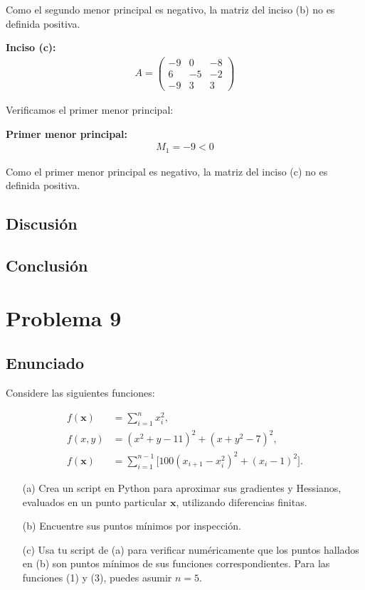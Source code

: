 \documentclass{article}
\begin{document}
Como el segundo menor principal es negativo, la matriz del inciso (b) no es definida positiva.

\textbf{Inciso (c):}
\begin{align}
     A=\begin{pmatrix} -9 & 0 & -8\\ 6 & -5 & -2\\ -9 & 3 & 3 \end{pmatrix}
\end{align}

Verificamos el primer menor principal:

\textbf{Primer menor principal:}
\begin{align}
M_1 = -9 < 0
\end{align}

Como el primer menor principal es negativo, la matriz del inciso (c) no es definida positiva.

\subsection{Discusión}

\subsection{Conclusión}

\section{Problema 9}

\subsection{Enunciado}
Considere las siguientes funciones:

\begin{align}
f(\mathbf{x}) &= \sum_{i=1}^{n} x_i^{2}, \label{eq:1}\\
f(x,y) &= (x^{2}+y-11)^{2} + (x+y^{2}-7)^{2}, \label{eq:2}\\
f(\mathbf{x}) &= \sum_{i=1}^{n-1} \bigl[100(x_{i+1}-x_i^{2})^{2} + (x_i-1)^{2}\bigr]. \label{eq:3}
\end{align}

\begin{enumerate}
  \item[(a)] Crea un script en Python para aproximar sus gradientes y Hessianos, evaluados en un punto particular $\mathbf{x}$, utilizando diferencias finitas.
  \item[(b)] Encuentre sus puntos mínimos por inspección.
  \item[(c)] Usa tu script de (a) para verificar numéricamente que los puntos hallados en (b) son puntos mínimos de sus funciones correspondientes. Para las funciones (1) y (3), puedes asumir $n=5$.
\end{enumerate}
\end{document}
